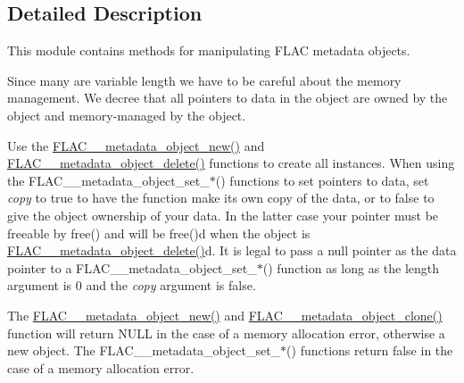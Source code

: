 

\subsection{Detailed Description}
This module contains methods for manipulating F\+L\+AC metadata objects. 

Since many are variable length we have to be careful about the memory management. We decree that all pointers to data in the object are owned by the object and memory-\/managed by the object.

Use the \hyperlink{group__flac__metadata__object_ga0d21a62648d8c5321b4b47f8ee5a52f0}{F\+L\+A\+C\+\_\+\+\_\+metadata\+\_\+object\+\_\+new()} and \hyperlink{group__flac__metadata__object_ga66bbe27dba68ba77be5af83986a280ea}{F\+L\+A\+C\+\_\+\+\_\+metadata\+\_\+object\+\_\+delete()} functions to create all instances. When using the F\+L\+A\+C\+\_\+\+\_\+metadata\+\_\+object\+\_\+set\+\_\+$\ast$() functions to set pointers to data, set {\itshape copy} to {\ttfamily true} to have the function make it\textquotesingle{}s own copy of the data, or to {\ttfamily false} to give the object ownership of your data. In the latter case your pointer must be freeable by free() and will be free()d when the object is \hyperlink{group__flac__metadata__object_ga66bbe27dba68ba77be5af83986a280ea}{F\+L\+A\+C\+\_\+\+\_\+metadata\+\_\+object\+\_\+delete()}d. It is legal to pass a null pointer as the data pointer to a F\+L\+A\+C\+\_\+\+\_\+metadata\+\_\+object\+\_\+set\+\_\+$\ast$() function as long as the length argument is 0 and the {\itshape copy} argument is {\ttfamily false}.

The \hyperlink{group__flac__metadata__object_ga0d21a62648d8c5321b4b47f8ee5a52f0}{F\+L\+A\+C\+\_\+\+\_\+metadata\+\_\+object\+\_\+new()} and \hyperlink{group__flac__metadata__object_ga16b828b246e9af941e3e616e6bcd74c0}{F\+L\+A\+C\+\_\+\+\_\+metadata\+\_\+object\+\_\+clone()} function will return {\ttfamily N\+U\+LL} in the case of a memory allocation error, otherwise a new object. The F\+L\+A\+C\+\_\+\+\_\+metadata\+\_\+object\+\_\+set\+\_\+$\ast$() functions return {\ttfamily false} in the case of a memory allocation error.

